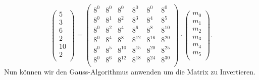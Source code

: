 \[
\begin{pmatrix}
	5 \\ 3 \\ 6 \\ 2 \\ 10 \\ 2 \\
\end{pmatrix}
=
\begin{pmatrix}
	8^0&    8^0&    8^0&    8^0&    8^0&    8^0\\
	8^0&	8^1&	8^2&	8^3&	8^4&	8^5\\
	8^0&	8^2&	8^4&	8^6&	8^8& 8^{10}\\
	8^0&	8^4&	8^8& 8^{12}& 8^{16}& 8^{20}\\
	8^0&	8^5& 8^{10}& 8^{15}& 8^{20}& 8^{25}\\
	8^0&	8^6& 8^{12}& 8^{18}& 8^{24}& 8^{30}\\
\end{pmatrix}
\cdot
\begin{pmatrix}
	m_0 \\ m_1 \\ m_2 \\ m_3 \\ m_4 \\ m_5 \\
\end{pmatrix}
.
\]
Nun können wir den Gauss-Algorithmus anwenden um die Matrix zu Invertieren.
